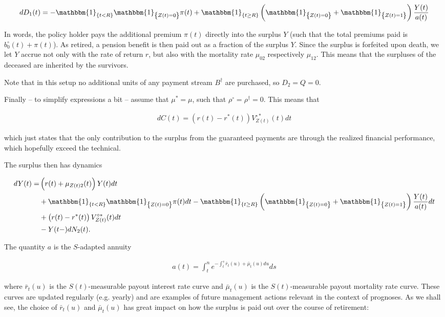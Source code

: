 \documentclass{book}
\newcommand{\1}[1]{\mathbbm{1}_{\left\lbrace #1 \right\rbrace}}
\theoremstyle{break}
\theoremstyle{remark}
\numberwithin{equation}{section}
\begin{document}
\begin{align*}
	dD_1(t) = - \1{t<R} \1{Z(t)=0} \pi(t) + \1{t \geq R} \left( \1{Z(t)=0} + \1{Z(t)=1} \right) \frac{Y(t)}{a(t)}
\end{align*}

In words, the policy holder pays the additional premium $\pi(t)$ directly into the surplus $Y$ (such that the total premiums paid is $b_0^\circ(t)+ \pi(t)$). As retired, a pension benefit is then paid out as a fraction of the surplus $Y$. Since the surplus is forfeited upon death, we let $Y$ accrue not only with the rate of return $r$, but also with the mortality rate $\mu_{02}$ respectively $\mu_{12}$. This means that the surpluses of the deceased are inherited by the survivors.

Note that in this setup no additional units of any payment stream $B^\dagger$ are purchased, so $D_2=Q=0$.

Finally -- to simplify expressions a bit -- assume that $\mu^*=\mu$, such that $\rho^\circ = \rho^\dagger = 0$. This means that

\begin{align*}
	dC(t) = \left( r(t) - r^*(t) \right) V_{Z(t)}^{\circ*}(t) dt
\end{align*}

which just states that the only contribution to the surplus from the guaranteed payments are through the realized financial performance, which hopefully exceed the technical.

The surplus then has dynamics

\begin{align*}
	dY(t) =& \left( r(t) + \mu_{Z(t)2}(t) \right) Y(t) dt \\
	&+ \1{t<R} \1{Z(t)=0} \pi(t) dt - \1{t \geq R} \left( \1{Z(t)=0} + \1{Z(t)=1} \right) \frac{Y(t)}{a(t)} dt \\
	&+ \left( r(t) - r^*(t) \right) V_{Z(t)}^{\circ*}(t) dt \\
	&- Y(t-) dN_2(t).
\end{align*}

The quantity $a$ is the $S$-adapted annuity

\begin{align*}
	a(t) = \int_t^n e^{-\int_t^s \bar{r}_t(u) + \bar{\mu}_t(u) du} ds
\end{align*}

where $\bar{r}_t(u)$ is the $S(t)$-measurable payout interest rate curve and $\bar{\mu}_t(u)$ is the  $S(t)$-measurable payout mortality rate curve. These curves are updated regularly (e.g. yearly) and are examples of future management actions relevant in the context of prognoses. As we shall see, the choice of $\bar{r}_t(u)$ and $\bar{\mu}_t(u)$ has great impact on how the surplus is paid out over the course of retirement:
\end{document}
